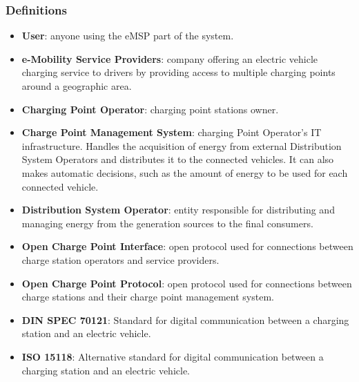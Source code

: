 \documentclass[table, 12pt]{article} %
\begin{document}
    \subsubsection*{Definitions}
        \begin{itemize}
            \item \textbf{User}: anyone using the eMSP part of the system.
            \item \textbf{e-Mobility Service Providers}: company offering an electric vehicle charging service to drivers by providing access to multiple charging points around a geographic area.
            \item \textbf{Charging Point Operator}: charging point stations owner.
            \item \textbf{Charge Point Management System}: charging Point Operator's IT infrastructure. Handles the acquisition of energy from external Distribution System Operators and distributes it to the connected vehicles. It can also makes automatic decisions, such as the amount of energy to be used for each connected vehicle.
            \item \textbf{Distribution System Operator}: entity responsible for distributing and managing energy from the generation sources to the final consumers.
            \item \textbf{Open Charge Point Interface}: open protocol used for connections between charge station operators and service providers.
            \item \textbf{Open Charge Point Protocol}: open protocol used for connections between charge stations and their charge point management system.
            \item \textbf{DIN SPEC 70121}: Standard for digital communication between a charging station and an electric vehicle.
            \item \textbf{ISO 15118}: Alternative standard for digital communication between a charging station and an electric vehicle.
        \end{itemize}
\end{document}
